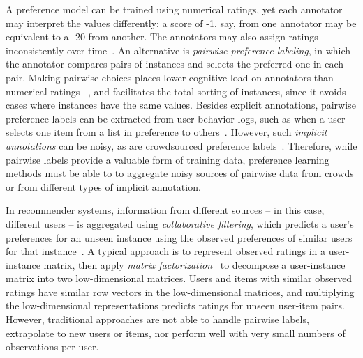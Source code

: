 A preference model can be trained using numerical ratings, yet 
each annotator may interpret the values differently: 
a score of -1, say, from one annotator may be equivalent to a -20 from another. 
The annotators may also assign ratings inconsistently
over time~\citep{?}. 
An alternative is \emph{pairwise preference labeling}, 
in which the annotator compares pairs of instances and selects the preferred one in each pair.
Making pairwise choices places lower cognitive load on annotators than numerical ratings ~\citep{kendall1948rank,kingsley2010preference},
and facilitates the total sorting of instances, since it avoids cases where instances have the same values.
Besides explicit annotations, pairwise preference labels can be extracted from
user behavior logs, such as when a user selects one item from a list in preference
to others~\citep{joachims2002optimizing}. 
However, such \emph{implicit annotations} can be noisy, as are crowdsourced preference labels~\citep{habernal2016argument}.
Therefore, while pairwise labels provide a valuable
form of training data, preference learning methods must be able to 
to aggregate noisy sources of pairwise data from crowds 
or from different types of implicit annotation.

In recommender systems, information from different sources -- in this case, different users --
 is aggregated using \emph{collaborative filtering},  
which predicts a user's preferences for an unseen instance using the observed preferences of similar users for that instance~\citep{?}.
A typical approach is to represent observed ratings in a user-instance matrix,
then apply \emph{matrix factorization}~\citep{?}
to decompose a user-instance matrix into two low-dimensional matrices.
Users and items with similar observed ratings have similar row vectors in the low-dimensional
matrices, and multiplying the low-dimensional representations predicts ratings for unseen
user-item pairs. 
However, traditional approaches are not able to handle pairwise labels,
extrapolate to new users or items,
nor perform well with very small numbers of observations per user\citep{?}. 

